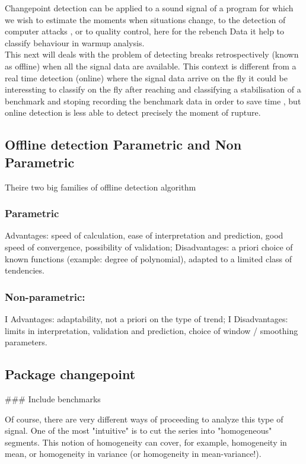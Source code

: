 \documentclass{article}
\begin{document}
Changepoint  detection can be applied to a sound signal of a program for which we wish to estimate the moments when situations change, to the detection of computer attacks  , or to quality control, here for the rebench Data it help to classify behaviour in warmup analysis. \\

This next will deals with the problem of detecting breaks retrospectively (known as offline) when all the signal data are available. This context is different from a real time detection (online) where the signal data arrive on the fly it could be interessting to classify on the fly after reaching  and classifying a stabilisation of a benchmark and stoping recording the benchmark data in order to save time , but online detection is less able to detect precisely the moment of rupture.

\subsection{Offline detection Parametric and Non Parametric}
 
 
Theire two big families of offline detection algorithm

\subsubsection{Parametric}

Advantages: speed of calculation, ease of interpretation and prediction,
good speed of convergence, possibility of validation;
Disadvantages: a priori choice of known functions (example: degree of polynomial), adapted to a limited class of tendencies.

\subsubsection{Non-parametric:}


I Advantages: adaptability, not a priori on the type of trend;
I Disadvantages: limits in interpretation, validation and prediction,
choice of window / smoothing parameters.

\subsection{Package changepoint}

\#\#\# Include benchmarks

Of course, there are very different ways of proceeding to analyze this type of signal. One of the most "intuitive" is to cut the series into "homogeneous" segments. This notion of homogeneity can cover, for example, homogeneity in mean, or homogeneity in variance (or homogeneity in mean-variance!).
\end{document}
